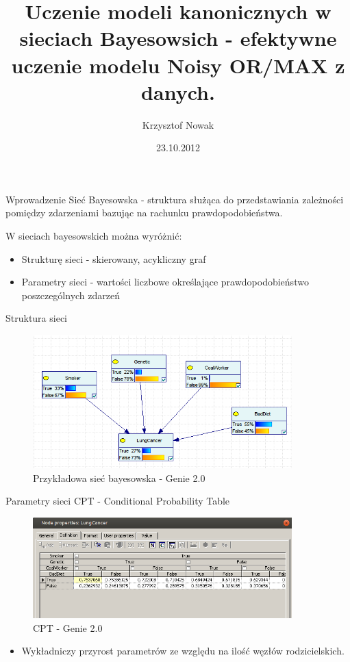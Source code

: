 \documentclass{beamer}
\title[Sieci Bayesowskie]{Uczenie modeli kanonicznych w sieciach Bayesowsich - efektywne uczenie modelu Noisy OR/MAX z danych.}
\author{Krzysztof Nowak}
\institute{Politechnika Białostocka}
\date{23.10.2012}
\begin{document}
\begin{frame}
\titlepage
\end{frame}

\begin{frame}{Wprowadzenie}
	Sieć Bayesowska - struktura służąca do przedstawiania zależności pomiędzy zdarzeniami bazując na rachunku prawdopodobieństwa.


	\pause W sieciach bayesowskich można wyróżnić:
	\begin{itemize}
		\pause \item Strukturę sieci - skierowany, acykliczny graf
		\pause \item Parametry sieci - wartości liczbowe określające prawdopodobieństwo poszczególnych zdarzeń
	\end{itemize}
	
\end{frame}

\begin{frame}{Struktura sieci}
	\begin{figure}[h!]
		\centering
		\includegraphics[width=10cm]{1.png}
		\caption{Przykładowa sieć bayesowska - Genie 2.0}
	\end{figure}
\end{frame}

\begin{frame}{Parametry sieci}
	CPT - Conditional Probability Table
	\begin{figure}[h!]
		\centering
		\includegraphics[width=10cm]{2.png}
		\caption{CPT - Genie 2.0}
	\end{figure}
	\begin{itemize}
		\item Wykładniczy przyrost parametrów ze względu na ilość węzłów rodzicielskich.
	\end{itemize}
\end{frame}
\end{document}
